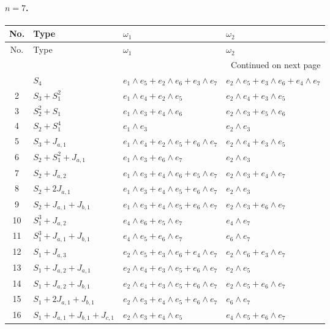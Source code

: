 \paragraph{$n=7$.}
\begin{longtable}{@{}c p{} p{} p{}@{}}
\toprule
No. & Type & $\omega_1$ & $\omega_2$ \\
\midrule
\endfirsthead
\toprule
No. & Type & $\omega_1$ & $\omega_2$ \\
\midrule
\endhead
\midrule
\multicolumn{4}{r}{Continued on next page}\\
\midrule
\endfoot
\bottomrule
\endlastfoot
1 & $S_{4}$ & $e_{1} \wedge e_{5} + e_{2} \wedge e_{6} + e_{3} \wedge e_{7}$ & $e_{2} \wedge e_{5} + e_{3} \wedge e_{6} + e_{4} \wedge e_{7}$ \\
2 & $S_{3} + S_{1}^{2}$ & $e_{1} \wedge e_{4} + e_{2} \wedge e_{5}$ & $e_{2} \wedge e_{4} + e_{3} \wedge e_{5}$ \\
3 & $S_{2}^{2} + S_{1}$ & $e_{1} \wedge e_{3} + e_{4} \wedge e_{6}$ & $e_{2} \wedge e_{3} + e_{5} \wedge e_{6}$ \\
4 & $S_{2} + S_{1}^{4}$ & $e_{1} \wedge e_{3}$ & $e_{2} \wedge e_{3}$ \\
5 & $S_{3} + J_{a,1}$ & $e_{1} \wedge e_{4} + e_{2} \wedge e_{5} + e_{6} \wedge e_{7}$ & $e_{2} \wedge e_{4} + e_{3} \wedge e_{5}$ \\
6 & $S_{2} + S_{1}^{2} + J_{a,1}$ & $e_{1} \wedge e_{3} + e_{6} \wedge e_{7}$ & $e_{2} \wedge e_{3}$ \\
7 & $S_{2} + J_{a,2}$ & $e_{1} \wedge e_{3} + e_{4} \wedge e_{6} + e_{5} \wedge e_{7}$ & $e_{2} \wedge e_{3} + e_{4} \wedge e_{7}$ \\
8 & $S_{2} + 2J_{a,1}$ & $e_{1} \wedge e_{3} + e_{4} \wedge e_{5} + e_{6} \wedge e_{7}$ & $e_{2} \wedge e_{3}$ \\
9 & $S_{2} + J_{a,1} + J_{b,1}$ & $e_{1} \wedge e_{3} + e_{4} \wedge e_{5} + e_{6} \wedge e_{7}$ & $e_{2} \wedge e_{3} + e_{6} \wedge e_{7}$ \\
10 & $S_{1}^{3} + J_{a,2}$ & $e_{4} \wedge e_{6} + e_{5} \wedge e_{7}$ & $e_{4} \wedge e_{7}$ \\
11 & $S_{1}^{3} + J_{a,1} + J_{b,1}$ & $e_{4} \wedge e_{5} + e_{6} \wedge e_{7}$ & $e_{6} \wedge e_{7}$ \\
12 & $S_{1} + J_{a,3}$ & $e_{2} \wedge e_{5} + e_{3} \wedge e_{6} + e_{4} \wedge e_{7}$ & $e_{2} \wedge e_{6} + e_{3} \wedge e_{7}$ \\
13 & $S_{1} + J_{a,2} + J_{a,1}$ & $e_{2} \wedge e_{4} + e_{3} \wedge e_{5} + e_{6} \wedge e_{7}$ & $e_{2} \wedge e_{5}$ \\
14 & $S_{1} + J_{a,2} + J_{b,1}$ & $e_{2} \wedge e_{4} + e_{3} \wedge e_{5} + e_{6} \wedge e_{7}$ & $e_{2} \wedge e_{5} + e_{6} \wedge e_{7}$ \\
15 & $S_{1} + 2J_{a,1} + J_{b,1}$ & $e_{2} \wedge e_{3} + e_{4} \wedge e_{5} + e_{6} \wedge e_{7}$ & $e_{6} \wedge e_{7}$ \\
16 & $S_{1} + J_{a,1} + J_{b,1} + J_{c,1}$ & $e_{2} \wedge e_{3} + e_{4} \wedge e_{5}$ & $e_{4} \wedge e_{5} + e_{6} \wedge e_{7}$ \\
\end{longtable}
